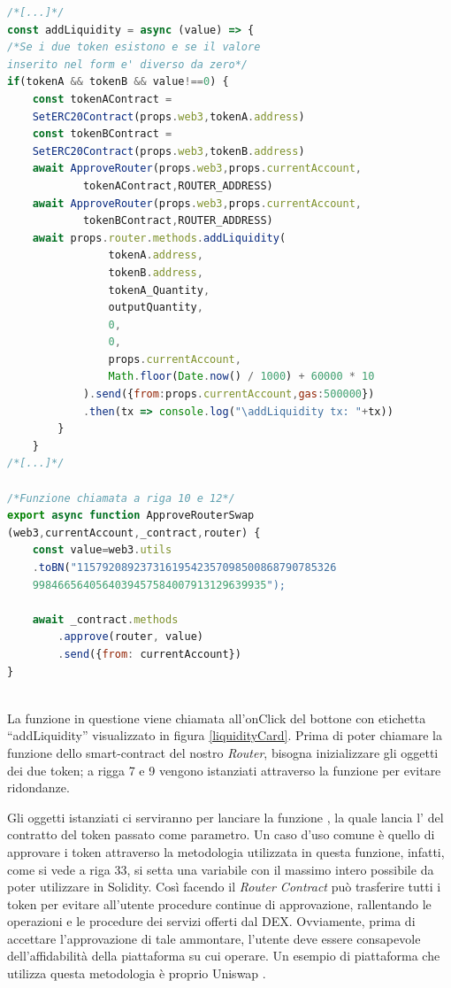 \begin{lstlisting}[caption={[Call \textcourier{addLiquidity()} Function (front-end)]},language=jsx] 
/*[...]*/
const addLiquidity = async (value) => {
/*Se i due token esistono e se il valore 
inserito nel form e' diverso da zero*/
if(tokenA && tokenB && value!==0) {
    const tokenAContract =
    SetERC20Contract(props.web3,tokenA.address)
    const tokenBContract =
    SetERC20Contract(props.web3,tokenB.address)
    await ApproveRouter(props.web3,props.currentAccount,
            tokenAContract,ROUTER_ADDRESS)
    await ApproveRouter(props.web3,props.currentAccount,
            tokenBContract,ROUTER_ADDRESS)
    await props.router.methods.addLiquidity(
                tokenA.address,
                tokenB.address,
                tokenA_Quantity,
                outputQuantity,
                0,
                0,
                props.currentAccount,
                Math.floor(Date.now() / 1000) + 60000 * 10
            ).send({from:props.currentAccount,gas:500000})
            .then(tx => console.log("\addLiquidity tx: "+tx))
        }
    }
/*[...]*/

/*Funzione chiamata a riga 10 e 12*/
export async function ApproveRouterSwap
(web3,currentAccount,_contract,router) {
	const value=web3.utils
    .toBN("11579208923731619542357098500868790785326
    9984665640564039457584007913129639935");
    
    await _contract.methods
        .approve(router, value)
        .send({from: currentAccount})
}
                                                                                                      -addLiquidity(front-end)
\end{lstlisting}\makeatletter{}\makeatother
\label{addLiquidity(front-end)}

La funzione in questione viene chiamata all'onClick del bottone con etichetta “addLiquidity” visualizzato in figura \ref{liquidityCard}. Prima di poter chiamare la funzione dello smart-contract del nostro \textit{Router}, bisogna inizializzare gli oggetti  dei due token; a rigga 7 e 9 vengono istanziati attraverso la funzione  per evitare ridondanze. 

Gli oggetti istanziati ci serviranno per lanciare la funzione , la quale lancia l' del contratto del token passato come parametro. Un caso d'uso comune è quello di approvare i token attraverso la metodologia utilizzata in questa funzione, infatti, come si vede a riga 33, si setta una variabile con il massimo intero possibile da poter utilizzare in Solidity. Così facendo il \textit{Router Contract} può trasferire tutti i token per evitare all'utente procedure continue di approvazione, rallentando le operazioni e le procedure dei servizi offerti dal DEX. Ovviamente, prima di accettare l'approvazione di tale ammontare, l'utente deve essere consapevole dell'affidabilità della piattaforma su cui operare. Un esempio di piattaforma che utilizza questa metodologia è proprio Uniswap \cite{uniswap}.

